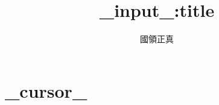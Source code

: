 \documentclass{jarticle}
\begin{document}
\title{{{_input_:title}}}
\author{國領正真}
\maketitle

\section{{{_cursor_}}}
\end{document}
